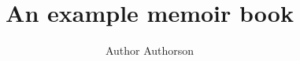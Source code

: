 \documentclass{memoir}
\title{An example memoir book}
\author{Author Authorson}
\date{}
\begin{document}
	\blinddocument
    \frontmatter
        
        
        
        
        \cleardoublepage
        \tableofcontents*
    \mainmatter
            
            
    \backmatter
\end{document}
